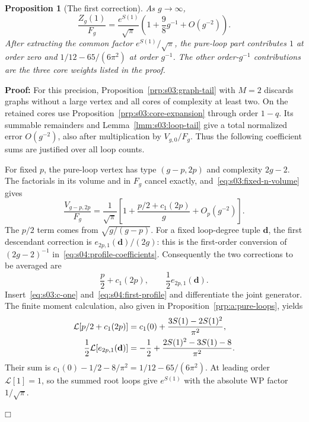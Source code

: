 \documentclass[a4paper,10pt]{article}
\numberwithin{equation}{section}
\theoremstyle{paperplain}
\newtheorem{prp}[thm]{Proposition}
\theoremstyle{paperremark}
\theoremstyle{paperplain}
\newenvironment{prf}{\noindent \textbf{Proof: }}{\hfill $\mdlgwhtsquare$\par\addvspace{0.5\baselineskip}}
\begin{document}
\begin{prp}[The first correction]\label{prp:s04:first-correction}
As $g\to\infty$,
\begin{equation}\label{eq:s04:first-correction}
 \frac{Z_g(1)}{F_g}
 =\frac{e^{S(1)}}{\sqrt\pi}
       \left(1+\frac{9}{8}g^{-1}+O(g^{-2})\right).
\end{equation}
After extracting the common factor $e^{S(1)}/\sqrt\pi$, the pure-loop
part contributes $1$ at order zero and
$1/12-65/(6\pi^2)$ at order $g^{-1}$. The other order-$g^{-1}$
contributions are the three core weights listed in the proof.
\end{prp}
\begin{prf}
For this precision, Proposition~\ref{prp:s03:graph-tail} with $M=2$
discards graphs without a large vertex and all cores of complexity
at least two. On the retained cores use
Proposition~\ref{prp:s03:core-expansion} through order $1-q$.
Its summable remainders and Lemma~\ref{lmm:s03:loop-tail} give a total
normalized error $O(g^{-2})$, also after multiplication by
$V_{g,0}/F_g$. Thus the following coefficient sums
are justified over all loop counts.

For fixed $p$, the pure-loop vertex has type $(g-p,2p)$ and complexity
$2g-2$. The factorials in its volume and in $F_g$ cancel exactly,
and~\eqref{eq:s03:fixed-n-volume} gives
\begin{equation}\label{eq:s04:pure-loop-volume}
 \frac{V_{g-p,2p}}{F_g}
 =\frac1{\sqrt\pi}
  \left[1+\frac{p/2+c_1(2p)}g+O_p(g^{-2})\right].
\end{equation}
The $p/2$ term comes from $\sqrt{g/(g-p)}$. For a fixed loop-degree
tuple $\mathbf d$, the first descendant correction is
$e_{2p,1}(\mathbf d)/(2g)$: this is the first-order conversion of
$(2g-2)^{-1}$ in~\eqref{eq:s04:profile-coefficients}.
Consequently the two corrections to be averaged are
\[
 \frac p2+c_1(2p),\qquad \frac12e_{2p,1}(\mathbf d).
\]
Insert~\eqref{eq:s03:c-one} and~\eqref{eq:s04:first-profile} and
differentiate the joint generator. The finite moment calculation,
also given in Proposition~\ref{prp:a:pure-loops}, yields
\begin{align}
 \mathcal L[p/2+c_1(2p)]
    &=c_1(0)+\frac{3S(1)-2S(1)^2}{\pi^2},\notag\\
 \frac12\mathcal L[e_{2p,1}(\mathbf d)]
    &=-\frac12+\frac{2S(1)^2-3S(1)-8}{\pi^2}.
 \label{eq:s04:first-loop-averages}
\end{align}
Their sum is
$c_1(0)-1/2-8/\pi^2=1/12-65/(6\pi^2)$.
At leading order $\mathcal L[1]=1$, so the summed root loops give
$e^{S(1)}$ with the absolute WP factor $1/\sqrt\pi$.


\end{prf}
\end{document}

